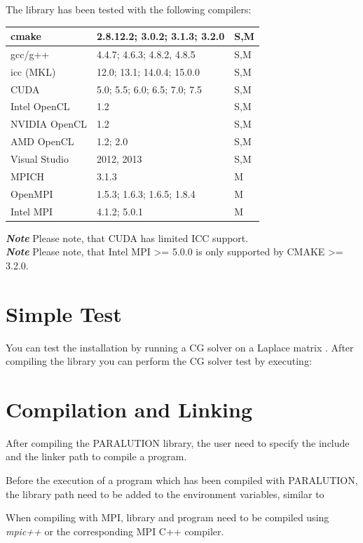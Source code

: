 The library has been tested with the following compilers: 

\begin{table}[!h]
  \centering
\begin{tabular}{ l l l }
    \hline
  cmake & 2.8.12.2; 3.0.2; 3.1.3; 3.2.0 & S,M \\
    \hline
  gcc/g++ & 4.4.7; 4.6.3; 4.8.2, 4.8.5 & S,M \\
    \hline
  icc (MKL) & 12.0; 13.1; 14.0.4; 15.0.0 & S,M \\
    \hline
  CUDA & 5.0; 5.5; 6.0; 6.5; 7.0; 7.5  & S,M \\
    \hline
  Intel OpenCL  & 1.2 & S,M \\
    \hline
  NVIDIA OpenCL  & 1.2 & S,M \\
    \hline
  AMD OpenCL  & 1.2; 2.0 & S,M \\
    \hline
  Visual Studio  & 2012, 2013 & S,M \\
    \hline
  MPICH       & 3.1.3 & M \\
  OpenMPI      & 1.5.3; 1.6.3; 1.6.5; 1.8.4 & M \\
  Intel MPI   & 4.1.2; 5.0.1 & M \\
    \hline

\end{tabular}
\end{table}

\textbf{\emph{Note}} Please note, that CUDA has limited ICC support. \\
\textbf{\emph{Note}} Please note, that Intel MPI \textgreater = 5.0.0 is only supported by CMAKE \textgreater = 3.2.0.


\section{Simple Test}
You can test the installation by running a CG solver on a Laplace matrix \cite{gr3030}. After compiling the library you can perform the CG solver test by executing:



\section{Compilation and Linking}

After compiling the PARALUTION library, the user need to specify the include and the linker path to compile a program.



Before the execution of a program which has been compiled with PARALUTION, the library path need to be added to the environment variables, similar to


When compiling with MPI, library and program need to be compiled using \emph{mpic++} or the corresponding MPI C++ compiler.
